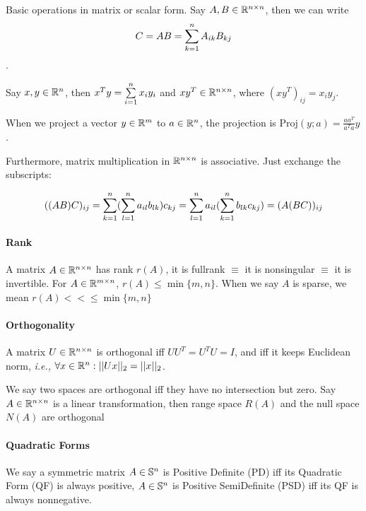 \documentclass[a4,10pt]{ctexart}
\begin{document}
Basic operations in matrix or scalar form. Say $A, B \in \mathbb{R}^{n \times n}$, then we can write $$C = AB = \sum \limits_{k=1}^n A_{ik}B_{kj}$$.

Say $x, y \in \mathbb{R}^n$, then $x^Ty = \sum \limits_{i=1}^n x_i y_i$ and $xy^T \in \mathbb{R}^{n \times n}$, where $(xy^T)_{ij} = x_i y_j$.

\begin{rk}
When we project a vector $y \in \mathbb{R}^m$ to $a \in \mathbb{R}^n$, the projection is $\text{Proj}(y;a) = \frac{aa^T}{a^Ta}y$.
\end{rk}

Furthermore, matrix multiplication in $\mathbb{R}^{n \times n}$ is associative. Just exchange the subscripts:

\begin{equation}
    ((AB)C)_{ij} = \sum \limits_{k=1}^n  ( \sum \limits_{l=1}^n a_{il} b_{lk} ) c_{kj} = \sum \limits_{l=1}^n  a_{il} ( \sum \limits_{k=1}^n b_{lk} c_{kj} ) = (A(BC))_{ij}
\end{equation}

\paragraph{Rank}

A matrix $A \in \mathbb{R}^{n \times n}$ has rank $r(A)$, it is fullrank $\equiv$ it is nonsingular $\equiv$ it is invertible. For $A \in \mathbb{R}^{m \times n}$, $r(A) \leq \min \{ m,n \}$. When we say $A$ is sparse, we mean $r(A) << \leq \min \{ m,n \}$

\paragraph{Orthogonality}

A matrix $U \in \mathbb{R}^{n \times n}$ is orthogonal iff $U U^T = U^T U = I$, and iff it keeps Euclidean norm, \emph{i.e.,} $\forall x \in \mathbb{R}^n: ||Ux||_2 = ||x||_2$.

\begin{hint}
We say two spaces are orthogonal iff they have no intersection but zero. Say $A \in \mathbb{R}^{n \times n}$ is a linear transformation, then range space $R(A)$ and the null space $N(A)$ are orthogonal
\end{hint}

\paragraph{Quadratic Forms}

We say a symmetric matrix $A \in \mathbb{S}^n$ is Positive Definite (PD) iff its Quadratic Form (QF) is always positive, $A \in \mathbb{S}^n$ is Positive SemiDefinite (PSD) iff its QF is always nonnegative.
\end{document}
